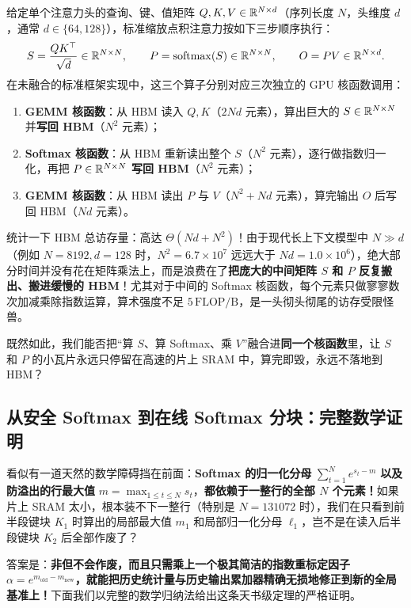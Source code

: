 给定单个注意力头的查询、键、值矩阵 $Q, K, V \in \mathbb{R}^{N \times d}$（序列长度 $N$，头维度 $d$，通常 $d \in \{64, 128\}$），标准缩放点积注意力按如下三步顺序执行：
\begin{equation}
  S = \frac{Q K^\top}{\sqrt{d}} \in \mathbb{R}^{N \times N}, \qquad
  P = \operatorname{softmax}(S) \in \mathbb{R}^{N \times N}, \qquad
  O = P V \in \mathbb{R}^{N \times d}.
  \label{eq:std-attn}
\end{equation}
在未融合的标准框架实现中，这三个算子分别对应三次独立的 GPU 核函数调用：
\begin{enumerate}
  \item \textbf{GEMM 核函数}：从 HBM 读入 $Q, K$（$2Nd$ 元素），算出巨大的 $S \in \mathbb{R}^{N\times N}$ 并\textbf{写回 HBM}（$N^2$ 元素）；
  \item \textbf{Softmax 核函数}：从 HBM 重新读出整个 $S$（$N^2$ 元素），逐行做指数归一化，再把 $P \in \mathbb{R}^{N\times N}$ \textbf{写回 HBM}（$N^2$ 元素）；
  \item \textbf{GEMM 核函数}：从 HBM 读出 $P$ 与 $V$（$N^2 + Nd$ 元素），算完输出 $O$ 后写回 HBM（$Nd$ 元素）。
\end{enumerate}
统计一下 HBM 总访存量：高达 $\Theta(Nd + N^2)$！由于现代长上下文模型中 $N \gg d$（例如 $N = 8192, d = 128$ 时，$N^2 = 6.7\times 10^7$ 远远大于 $Nd = 1.0\times 10^6$），绝大部分时间并没有花在矩阵乘法上，而是浪费在了\textbf{把庞大的中间矩阵 $S$ 和 $P$ 反复搬出、搬进缓慢的 HBM}！尤其对于中间的 Softmax 核函数，每个元素只做寥寥数次加减乘除指数运算，算术强度不足 $5\,\mathrm{FLOP/B}$，是一头彻头彻尾的访存受限怪兽。

既然如此，我们能否把“算 $S$、算 Softmax、乘 $V$”融合进\textbf{同一个核函数}里，让 $S$ 和 $P$ 的小瓦片永远只停留在高速的片上 SRAM 中，算完即毁，永远不落地到 HBM？

\subsection{从安全 Softmax 到在线 Softmax 分块：完整数学证明}

看似有一道天然的数学障碍挡在前面：\textbf{Softmax 的归一化分母} $\sum_{t=1}^{N} e^{s_t - m}$ \textbf{以及防溢出的行最大值} $m = \max_{1 \le t \le N} s_t$，\textbf{都依赖于一整行的全部 $N$ 个元素！}如果片上 SRAM 太小，根本装不下一整行（特别是 $N = 131072$ 时），我们在只看到前半段键块 $K_1$ 时算出的局部最大值 $m_1$ 和局部归一化分母 $\ell_1$，岂不是在读入后半段键块 $K_2$ 后全部作废了？

答案是：\textbf{非但不会作废，而且只需乘上一个极其简洁的指数重标定因子 $\alpha = e^{m_{\mathrm{old}} - m_{\mathrm{new}}}$，就能把历史统计量与历史输出累加器精确无损地修正到新的全局基准上！}下面我们以完整的数学归纳法给出这条天书级定理的严格证明。

